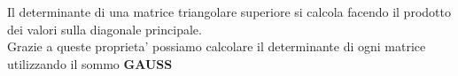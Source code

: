 \documentclass{report}
\begin{document}
Il determinante di una matrice triangolare superiore si calcola facendo il prodotto dei valori sulla diagonale principale. \\
Grazie a queste proprieta' possiamo calcolare il determinante di ogni matrice utilizzando il sommo \textbf{GAUSS}
\end{document}
